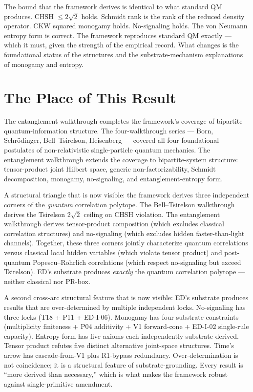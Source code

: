 \documentclass[11pt,a4paper]{article}
\begin{document}
The bound that the framework derives is identical to what standard QM produces. CHSH $\leq 2\sqrt{2}$ holds. Schmidt rank is the rank of the reduced density operator. CKW squared monogamy holds. No-signaling holds. The von Neumann entropy form is correct. The framework reproduces standard QM exactly --- which it must, given the strength of the empirical record. What changes is the foundational status of the structures and the substrate-mechanism explanations of monogamy and entropy.

\section{The Place of This Result}

The entanglement walkthrough completes the framework's coverage of bipartite quantum-information structure. The four-walkthrough series --- Born, Schr\"odinger, Bell--Tsirelson, Heisenberg --- covered all four foundational postulates of non-relativistic single-particle quantum mechanics. The entanglement walkthrough extends the coverage to bipartite-system structure: tensor-product joint Hilbert space, generic non-factorizability, Schmidt decomposition, monogamy, no-signaling, and entanglement-entropy form.

A structural triangle that is now visible: the framework derives three independent corners of the \emph{quantum} correlation polytope. The Bell--Tsirelson walkthrough derives the Tsirelson $2\sqrt{2}$ ceiling on CHSH violation. The entanglement walkthrough derives tensor-product composition (which excludes classical correlation structures) and no-signaling (which excludes hidden faster-than-light channels). Together, these three corners jointly characterize quantum correlations versus classical local hidden variables (which violate tensor product) and post-quantum Popescu--Rohrlich correlations (which respect no-signaling but exceed Tsirelson). ED's substrate produces \emph{exactly} the quantum correlation polytope --- neither classical nor PR-box.

A second cross-arc structural feature that is now visible: ED's substrate produces results that are over-determined by multiple independent locks. No-signaling has three locks (T18 + P11 + ED-I-06). Monogamy has four substrate constraints (multiplicity finiteness + P04 additivity + V1 forward-cone + ED-I-02 single-rule capacity). Entropy form has five axioms each independently substrate-derived. Tensor product refutes five distinct alternative joint-space structures. Time's arrow has cascade-from-V1 plus R1-bypass redundancy. Over-determination is not coincidence; it is a structural feature of substrate-grounding. Every result is ``more derived than necessary,'' which is what makes the framework robust against single-primitive amendment.
\end{document}
